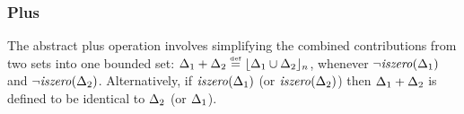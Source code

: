 


\subsubsection{Plus} The abstract plus operation involves simplifying
the combined contributions from two sets into one bounded set:
$ \Delta_{1} + \Delta_{2} \stackrel{\smash{\scriptscriptstyle \mathrm{def}}}= \lfloor \Delta_{1} \cup \Delta_{2} \rfloor_{n} $,
whenever $ \neg\mathit{iszero}(\Delta_{1}) $ and $ \neg\mathit{iszero}(\Delta_{2})
$. Alternatively, if $ \mathit{iszero}(\Delta_{1}) $ (or $ \mathit{iszero}(\Delta_{2}) $)
then $ \Delta_{1} + \Delta_{2} $ is defined to be identical to $
\Delta_{2} $ (or $ \Delta_{1} $).

